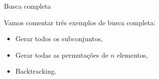 \begin{frame}{Busca completa}

    Vamos comentar três exemplos de busca completa:
    \begin{itemize}
        \item Gerar todos os subconjuntos,
        \item Gerar todas as permutações de $n$ elementos,
        \item Backtracking.
    \end{itemize}
    
\end{frame}

